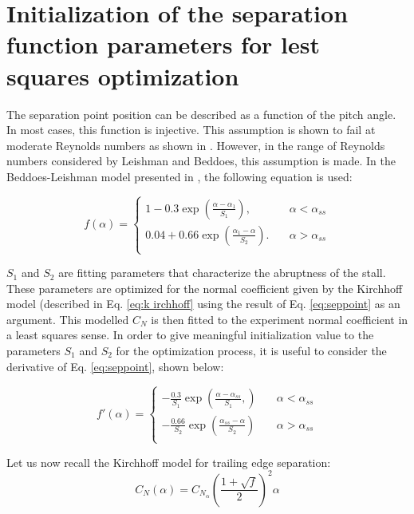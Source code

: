 \section{Initialization of the separation function parameters for lest squares optimization}

The separation point position can be described as a function of the pitch angle. In most cases, this function is injective. This assumption is shown to fail at moderate Reynolds numbers as shown in \autocite{tank_possibility_2017}. However, in the range of Reynolds numbers considered by Leishman and Beddoes, this assumption is made. In the Beddoes-Leishman model presented in \autocite{leishman_semi-empirical_1989}, the following equation is used: 

\begin{equation}
f(\alpha) = 
     \begin{cases}
       1-0.3\exp(\frac{\alpha-\alpha_1}{S_1}), &\quad \alpha < \alpha_{ss}\\
        0.04+0.66\exp(\frac{\alpha_1-\alpha}{S_2}). &\quad \alpha > \alpha_{ss}\\
     \end{cases}
\label{eq:seppoint}
\end{equation}

\noindent $S_1$ and $S_2$ are fitting parameters that characterize the abruptness of the stall. These parameters are optimized for the normal coefficient given by the Kirchhoff model (described in Eq. \eqref{eq:k irchhoff} using the result of Eq. \eqref{eq:seppoint} as an argument.  This modelled $C_N$ is then fitted to the experiment normal coefficient in a least squares sense. In order to give meaningful initialization value to the parameters $S_1$ and $S_2$ for the optimization process, it is useful to consider the derivative of Eq. \eqref{eq:seppoint}, shown below:

\begin{equation} 
f'(\alpha) = 
     \begin{cases}
       -\frac{0.3}{S_1}\exp(\frac{\alpha-\alpha_{ss}}{S_1},) &\quad \alpha < \alpha_{ss}\\
        -\frac{0.66}{S_2}\exp(\frac{\alpha_{ss}-\alpha}{S_2}) &\quad \alpha > \alpha_{ss}\\
     \end{cases}
\end{equation}

Let us now recall the Kirchhoff model for trailing edge separation:
\begin{equation}
C_N (\alpha) = C_ {N_{\alpha}} \left(\frac{1+\sqrt{f}}{2}\right)^2 \alpha
\end{equation}

